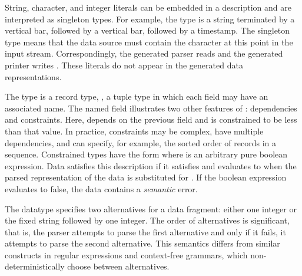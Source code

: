 String, character, and integer literals can be embedded in a
description and are interpreted as singleton types.  For example, the
 type is a string terminated by a vertical bar, followed by
a vertical bar, followed by a timestamp.  The singleton type 
means that the data source must contain the character  at this
point in the input stream. Correspondingly, the generated parser reads
 and the generated printer writes .  These literals do
not appear in the generated data representations.

The type  is a record type, \ie{}, a tuple type in
which each field may have an associated name.  The named field
 illustrates two other features of
\padsml: dependencies and constraints.  Here, 
depends on the previous field  and is constrained to be
less than that value.  In practice, constraints may be complex, have
multiple dependencies, and can specify, for example, the sorted order
of records in a sequence.  Constrained types have the form \cd{[x:T |
e]} where  is an arbitrary pure boolean expression.  Data
satisfies this description if it satisfies  and 
evaluates to  when the parsed representation of the data is
substituted for .  If the boolean expression evaluates to false,
the data contains a \textit{semantic} error.

The datatype  specifies two
alternatives for a data fragment: either one integer or the fixed
string  followed by one integer.  The order of
alternatives is significant, that is, the parser attempts to parse the
first alternative and only if it fails, it attempts to parse the
second alternative.  This semantics differs from similar constructs in
regular expressions and context-free grammars, which
non-deterministically choose between alternatives.


